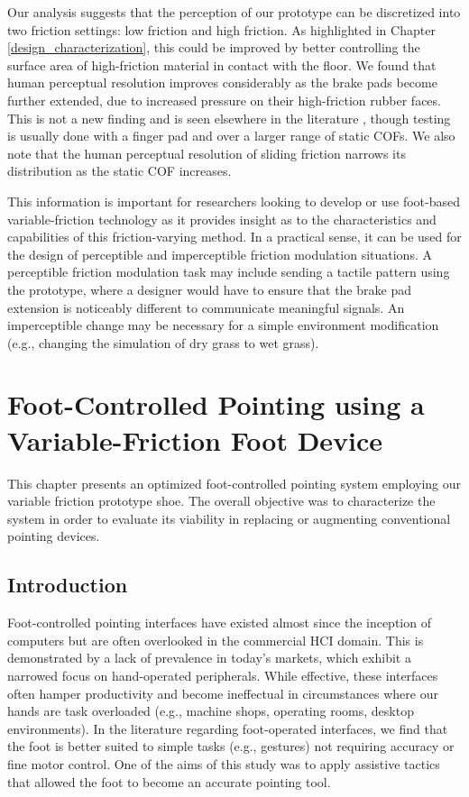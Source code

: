 \documentclass [12pt,letterpaper]{report}
\begin{document}
Our analysis suggests that the perception of our prototype can be discretized into two friction settings: low friction and high friction. As highlighted in Chapter \ref{design_characterization}, this could be improved by better controlling the surface area of high-friction material in contact with the floor. We found that human perceptual resolution improves considerably as the brake pads become further extended, due to increased pressure on their high-friction rubber faces. This is not a new finding and is seen elsewhere in the literature \cite{provancher2009fingerpad}, though testing is usually done with a finger pad and over a larger range of static COFs. We also note that the human perceptual resolution of sliding friction narrows its distribution as the static COF increases.

This information is important for researchers looking to develop or use foot-based variable-friction technology as it provides insight as to the characteristics and capabilities of this friction-varying method. In a practical sense, it can be used for the design of perceptible and imperceptible friction modulation situations. A perceptible friction modulation task may include sending a tactile pattern using the prototype, where a designer would have to ensure that the brake pad extension is noticeably different to communicate meaningful signals. An imperceptible change may be necessary for a simple environment modification (e.g., changing the simulation of dry grass to wet grass). 


\chapter{Foot-Controlled Pointing using a Variable-Friction Foot Device}
\label{foot_pointing}

This chapter presents an optimized foot-controlled pointing system employing our variable friction prototype shoe. The overall objective was to characterize the system in order to evaluate its viability in replacing or augmenting conventional pointing devices.


\section{Introduction}

Foot-controlled pointing interfaces have existed almost since the inception of computers \cite{english1967display} but are often overlooked in the commercial HCI domain. This is demonstrated by a lack of prevalence in today's markets, which exhibit a narrowed focus on hand-operated peripherals. While effective, these interfaces often hamper productivity and become ineffectual in circumstances where our hands are task overloaded (e.g., machine shops, operating rooms, desktop environments). In the literature regarding foot-operated interfaces, we find that the foot is better suited to simple tasks (e.g., gestures) not requiring accuracy or fine motor control. One of the aims of this study was to apply assistive tactics that allowed the foot to become an accurate pointing tool.
\end{document}
